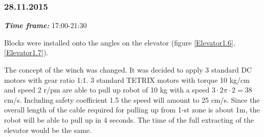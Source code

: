 \subsubsection{28.11.2015}
\textit{\textbf{Time frame:}} 17:00-21:30

Blocks were installed onto the angles on the elevator (figure \ref{Elevator1.6}, \ref{Elevator1.7}).

The concept of the winch was changed. It was decided to apply 3 standard DC motors with gear ratio 1:1. 3 standard TETRIX motors with torque 10 kg/cm and speed 2 r/pm are able to pull up robot of 10 kg with a speed $3 \cdot 2\pi \cdot 2 = 38$ cm/s. Including safety coefficient 1.5 the speed will amount to 25 cm/s. Since the overall length of the cable required for pulling up from 1-st zone is about 1m, the robot will be able to pull up in 4 seconds. The time of the full extracting of the elevator would be the same.

